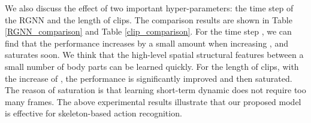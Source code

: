 \documentclass[runningheads]{llncs}
\begin{document}
\setlength{\tabcolsep}{6pt}
\begin{table}[t]
\begin{floatrow}

\begin{minipage}{0.4\linewidth}
\centering
{}
\end{minipage}

\hfil

\begin{minipage}{0.4\linewidth}
\centering
{}
\end{minipage}


\end{floatrow}
\end{table}

We also discuss the effect of two important hyper-parameters: the time step  of the RGNN and the length  of clips. The comparison results are shown in Table \ref{RGNN_comparison} and Table \ref{clip_comparison}. For the time step , we can find that the performance increases by a small amount when increasing , and saturates soon. We think that the high-level spatial structural features between a small number of body parts can be learned quickly. For the length  of clips, with the increase of , the performance is significantly improved and then saturated. The reason of saturation is that learning short-term dynamic does not require too many frames. The above experimental results illustrate that our proposed model is effective for skeleton-based action recognition.
\end{document}
